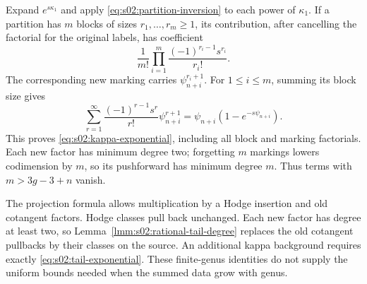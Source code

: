 \begin{prf}
Expand $e^{s\kappa_1}$ and apply
\eqref{eq:s02:partition-inversion} to each power of $\kappa_1$.
If a partition has $m$ blocks of sizes $r_1,\ldots,r_m\geq1$, its
contribution, after cancelling the factorial for the original labels,
has coefficient
\[
\frac{1}{m!}\prod_{i=1}^m
\frac{(-1)^{r_i-1}s^{r_i}}{r_i!}.
\]
The corresponding new marking carries $\psi_{n+i}^{r_i+1}$.
For $1\leq i\leq m$, summing its block size gives
\[
\sum_{r=1}^{\infty}\frac{(-1)^{r-1}s^r}{r!}\psi_{n+i}^{r+1}
=\psi_{n+i}(1-e^{-s\psi_{n+i}}).
\]
This proves \eqref{eq:s02:kappa-exponential}, including all block
and marking factorials.  Each new factor has minimum degree two;
forgetting $m$ markings lowers codimension by $m$, so its pushforward
has minimum degree $m$.  Thus terms with $m>3g-3+n$ vanish.
\end{prf}

The projection formula allows multiplication by a Hodge insertion and
old cotangent factors.  Hodge classes pull back unchanged.  Each new
factor has degree at least two, so
Lemma~\ref{lmm:s02:rational-tail-degree} replaces the old cotangent
pullbacks by their classes on the source.  An additional kappa
background requires exactly \eqref{eq:s02:tail-exponential}.
These finite-genus identities do not supply the uniform bounds needed
when the summed data grow with genus.
